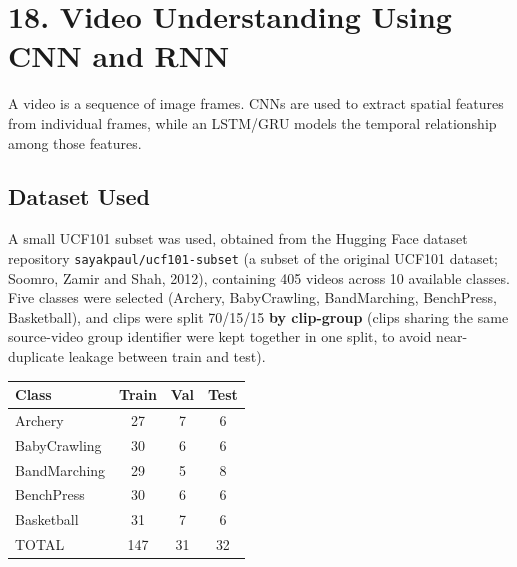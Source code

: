 \documentclass[10pt]{article}
\begin{document}
\section*{18. Video Understanding Using CNN and RNN}

A video is a sequence of image frames. CNNs are used to extract spatial
features from individual frames, while an LSTM/GRU models the temporal
relationship among those features.

\begin{center}
\end{center}

\subsection*{Dataset Used}

A small UCF101 subset was used, obtained from the Hugging Face dataset
repository \texttt{sayakpaul/ucf101-subset} (a subset of the original UCF101
dataset; Soomro, Zamir and Shah, 2012), containing 405 videos across 10
available classes. Five classes were selected (Archery, BabyCrawling,
BandMarching, BenchPress, Basketball), and clips were split 70/15/15
\textbf{by clip-group} (clips sharing the same source-video group identifier
were kept together in one split, to avoid near-duplicate leakage between
train and test).

\begin{center}
\begin{tabular}{|l|c|c|c|}
\hline
Class & Train & Val & Test\\
\hline
Archery & 27 & 7 & 6\\
BabyCrawling & 30 & 6 & 6\\
BandMarching & 29 & 5 & 8\\
BenchPress & 30 & 6 & 6\\
Basketball & 31 & 7 & 6\\
\hline
TOTAL & 147 & 31 & 32\\
\hline
\end{tabular}
\end{center}
\end{document}
